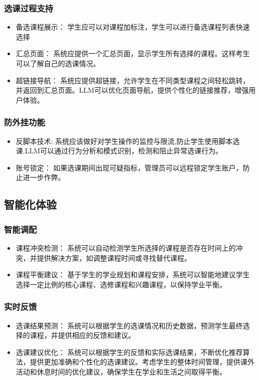 \documentclass{article}
\begin{document}
\subsubsection{选课过程支持}
\begin{itemize}
  \item 备选课程展示： 学生应可以对课程加标注，学生可以进行备选课程列表快速选择
  \item 汇总页面： 系统应提供一个汇总页面，显示学生所有选择的课程。这样考生可以了解自己的选课情况。
  \item 超链接导航： 系统应提供超链接，允许学生在不同类型课程之间轻松跳转，并返回到汇总页面。LLM可以优化页面导航，提供个性化的链接推荐，增强用户体验。
\end{itemize}

\subsubsection{防外挂功能}
\begin{itemize}
  \item 反脚本技术: 系统应该做好对学生操作的监控与限流,防止学生使用脚本选课.LLM可以通过行为分析和模式识别，检测和阻止异常选课行为。
  \item 账号锁定： 如果选课期间出现可疑指标，管理员可以远程锁定学生账户，防止进一步作弊。
\end{itemize}

\subsection{智能化体验}
\subsubsection{智能调配}
\begin{itemize}
  \item 课程冲突检测： 系统可以自动检测学生所选择的课程是否存在时间上的冲突，并提供解决方案，如调整课程时间或寻找替代课程。
  \item 课程平衡建议： 基于学生的学业规划和课程安排，系统可以智能地建议学生选择一定比例的核心课程、选修课程和兴趣课程，以保持学业平衡。
\end{itemize}

\subsubsection{实时反馈}
\begin{itemize}
  \item 选课结果预测： 系统可以根据学生的选课情况和历史数据，预测学生最终选择的课程，并提供相应的反馈和建议。
  \item 选课建议优化： 系统可以根据学生的反馈和实际选课结果，不断优化推荐算法，提供更加准确和个性化的选课建议。考虑学生的整体时间管理，提供课外活动和休息时间的优化建议，确保学生在学业和生活之间取得平衡。
\end{itemize}
\end{document}
